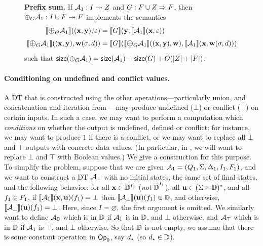 \begin{figure}[H]
\begin{dtbox}
\textbf{Prefix sum.}
If $\mathcal{A}_1: I \twoheadrightarrow Z$
and $G: F \cup Z \Rightarrow F$,
then $\prefixsum{\DT_1}{\DF}: \DTtype{I \cup F}{F}$
implements the semantics
\begin{align*}
\sem{\prefixsum{\DT_1}{\DF}}((\trc{x},\trc{y}),\varepsilon)
    &= \sem{\DF}(\trc{y},\sem{\DT_1}(\trc{x},\varepsilon)) \\
\sem{\prefixsum{\DT_1}{\DF}}((\trc{x},\trc{y}),\trc{w} (\sigma,d))
    &= \sem{\DF}(\sem{\prefixsum{\DT_1}{\DF}}((\trc{x},\trc{y}),\trc{w}),\sem{\DT_1}(\trc{x},\trc{w} (\sigma,d)))
\end{align*}
such that $\size{\prefixsum{\DT_1}{\DF}} = \size{\DT_1} + \size{\DF} + O(|Z| + |F|)$.
\end{dtbox}

\label{dt:fig:prefix-sum}
\end{figure}

\paragraph*{Conditioning on undefined and conflict values.}
A DT that is constructed using the other operations---particularly union, and concatenation and iteration from ---may produce undefined ($\bot$) or conflict ($\top$) on certain inputs. In such a case, we may want to perform a computation which \emph{conditions} on whether the output is undefined, defined or conflict: for instance, we may want to produce $1$ if there is a conflict, or we may want to replace all $\bot$ and $\top$ outputs with concrete data values. (In particular, in , we will want to replace $\bot$ and $\top$ with Boolean values.) We give a construction for this purpose. To simplify the problem, suppose that we are given $\mathcal{A}_1 = (Q_{1}, \Sigma, \Delta_{1}, I_{1}, F_{1})$, and we want to construct a DT $\mathcal{A}_\bot$ with no initial states, the same set of final states, and the following behavior: for all $\mathbf{x} \in \mathbb{D}^{I_1}$ (\emph{not} $\overline{\mathbb{D}{}}^{I_1}$), all $\mathbf{u} \in (\Sigma \times \mathbb{D})^{*}$, and all $f_1 \in F_1$, if $\llbracket \mathcal{A}_1 \rrbracket(\mathbf{x},\mathbf{u})(f_1) = \bot$ then $\llbracket \mathcal{A}_\bot \rrbracket(\mathbf{u})(f_1) \in \mathbb{D}$, and otherwise, $\llbracket \mathcal{A}_\bot \rrbracket(\mathbf{u})(f_1) = \bot$. Here, since $I = \varnothing$, the first argument is omitted. We similarly want to define $\mathcal{A}_{\mathbb{D}}$ which is in $\mathbb{D}$ if $\mathcal{A}_1$ is in $\mathbb{D}$, and $\bot$ otherwise, and $\mathcal{A}_\top$ which is in $\mathbb{D}$ if $\mathcal{A}_1$ is $\top$, and $\bot$ otherwise.
So that $\mathbb{D}$ is not empty, we assume that there is some constant operation in $\textsf{Op}_0$, say $d_\star$ (so $d_\star \in \mathbb{D}$).

